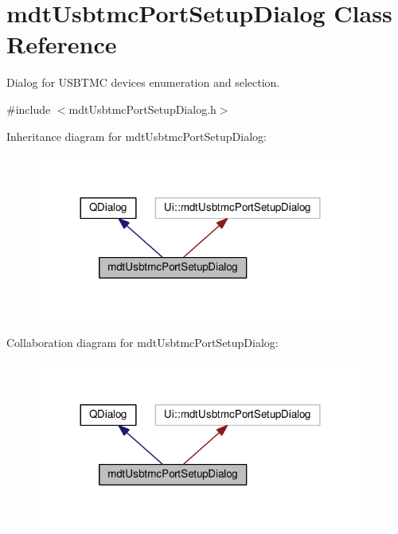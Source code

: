 \hypertarget{classmdt_usbtmc_port_setup_dialog}{\section{mdt\-Usbtmc\-Port\-Setup\-Dialog Class Reference}
\label{classmdt_usbtmc_port_setup_dialog}
}


Dialog for U\-S\-B\-T\-M\-C devices enumeration and selection.  




{\ttfamily \#include $<$mdt\-Usbtmc\-Port\-Setup\-Dialog.\-h$>$}



Inheritance diagram for mdt\-Usbtmc\-Port\-Setup\-Dialog\-:
\nopagebreak
\begin{figure}[H]
\begin{center}
\leavevmode
\includegraphics[width=305pt]{classmdt_usbtmc_port_setup_dialog__inherit__graph}
\end{center}
\end{figure}


Collaboration diagram for mdt\-Usbtmc\-Port\-Setup\-Dialog\-:
\nopagebreak
\begin{figure}[H]
\begin{center}
\leavevmode
\includegraphics[width=305pt]{classmdt_usbtmc_port_setup_dialog__coll__graph}
\end{center}
\end{figure}
